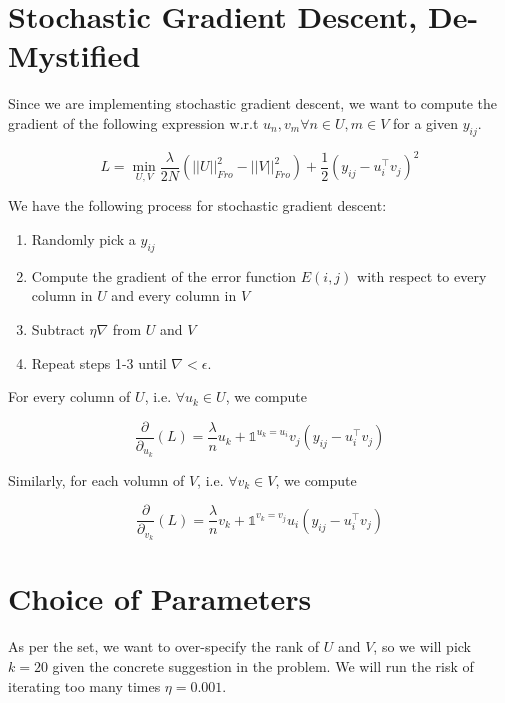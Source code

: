 \documentclass{article}
\begin{document}
\section*{Stochastic Gradient Descent, De-Mystified}

Since we are implementing stochastic gradient descent, we want to
compute the gradient of the following expression w.r.t $u_{n}, v_{m} \forall n \in U, m \in V$ for
a given $y_{ij}$.

$$ L =  \min_{U, V} \frac{\lambda}{2N} (||U||^{2}_{Fro} - ||V||^{2}_{Fro}) + \frac{1}{2} (y_{ij} - u_{i}^{\intercal}v_{j})^{2} $$

We have the following process for stochastic gradient descent:

\begin{enumerate}
    \item Randomly pick a $y_{ij}$
    \item Compute the gradient of the error function $E(i,j)$ with respect to every column
        in $U$ and every column in $V$
    \item Subtract $\eta \nabla$ from $U$ and $V$
    \item Repeat steps 1-3 until $\nabla < \epsilon$.
\end{enumerate}

\noindent For every column of $U$, i.e. $\forall u_{k} \in U$, we compute

$$ \frac{\partial}{\partial_{u_{k}}} (L) = \frac{\lambda}{n} u_{k} + \mathds{1}^{u_{k} = u_{i}} v_{j}(y_{ij} - u_{i}^{\intercal}v_{j}) $$

\noindent Similarly, for each volumn of $V$, i.e. $\forall v_{k} \in V$, we compute

$$ \frac{\partial}{\partial_{v_{k}}} (L) = \frac{\lambda}{n} v_{k} + \mathds{1}^{v_{k} = v_{j}} u_{i}(y_{ij} - u_{i}^{\intercal}v_{j}) $$

\section*{Choice of Parameters}
As per the set, we want to over-specify the rank of $U$ and $V$, so we will pick $k = 20$
given the concrete suggestion in the problem. We will run the risk of iterating too
many times $\eta = 0.001$.
\end{document}
